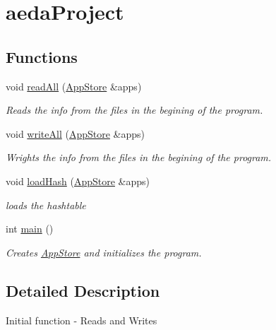 \hypertarget{group__aeda_project}{\section{aeda\-Project}
\label{group__aeda_project}
}
\subsection*{Functions}
\begin{DoxyCompactItemize}
\item 
void \hyperlink{group__aeda_project_ga18a538ccf84de6af3a63e5361de9ab74}{read\-All} (\hyperlink{class_app_store}{App\-Store} \&apps)
\begin{DoxyCompactList}\small\item\em Reads the info from the files in the begining of the program. \end{DoxyCompactList}\item 
void \hyperlink{group__aeda_project_gab8680cb0ec55bb1c599f68575e2804a0}{write\-All} (\hyperlink{class_app_store}{App\-Store} \&apps)
\begin{DoxyCompactList}\small\item\em Wrights the info from the files in the begining of the program. \end{DoxyCompactList}\item 
void \hyperlink{group__aeda_project_ga14cbc22ec0707dc2867f5610ce4914dd}{load\-Hash} (\hyperlink{class_app_store}{App\-Store} \&apps)
\begin{DoxyCompactList}\small\item\em loads the hashtable \end{DoxyCompactList}\item 
int \hyperlink{group__aeda_project_gae66f6b31b5ad750f1fe042a706a4e3d4}{main} ()
\begin{DoxyCompactList}\small\item\em Creates \hyperlink{class_app_store}{App\-Store} and initializes the program. \end{DoxyCompactList}\end{DoxyCompactItemize}


\subsection{Detailed Description}
Initial function -\/ Reads and Writes 

